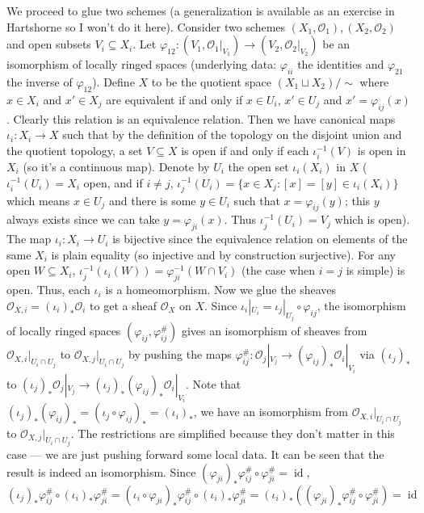 \documentclass[12pt]{article}
\theoremstyle{remark}
\newcommand{\id}[0]{\operatorname{id}}
\begin{document}
	We proceed to glue two schemes (a generalization is available as an exercise in Hartshorne so I won't do it here). Consider two schemes $(X_1,\mathscr O_1), (X_2, \mathscr O_2)$ and open subsets $V_i\subseteq X_i$. Let $\varphi_{12}: (V_1,\mathscr O_1|_{V_1})\to (V_2,\mathscr O_2|_{V_2})$ be an isomorphism of locally ringed spaces (underlying data: $\varphi_{ii}$ the identities and $\varphi_{21}$ the inverse of $\varphi_{12}$). Define $X$ to be the quotient space $(X_1\sqcup X_2)/\sim$ where $x\in X_i$ and $x'\in X_j$ are equivalent if and only if $x\in U_i$, $x'\in U_j$ and $x'=\varphi_{ij}(x)$. Clearly this relation is an equivalence relation. Then we have canonical maps $\iota_i:X_i\to X$ such that by the definition of the topology on the disjoint union and the quotient topology, a set $V\subseteq X$ is open if and only if each $\iota_i^{-1}(V)$ is open in $X_i$ (so it's a continuous map). Denote by $U_i$ the open set $\iota_i(X_i)$ in $X$ ($\iota_i^{-1}(U_i)=X_i$ open, and if $i\neq j$, $\iota_j^{-1}(U_i)=\{x\in X_j:[x]=[y]\in\iota_i(X_i)\}$ which means $x\in U_j$ and there is some $y\in U_i$ such that $x=\varphi_{ij}(y)$; this $y$ always exists since we can take $y=\varphi_{ji}(x)$. Thus $\iota_j^{-1}(U_i)=V_j$ which is open). The map $\iota_i:X_i\to U_i$ is bijective since the equivalence relation on elements of the same $X_i$ is plain equality (so injective and by construction surjective). For any open $W\subseteq X_i$, $\iota_j^{-1}(\iota_i(W))=\varphi_{ji}^{-1}(W\cap V_i)$ (the case when $i=j$ is simple) is open. Thus, each $\iota_i$ is a homeomorphism. Now we glue the sheaves $\mathscr O_{X, i}=\left(\iota_{i}\right)_*\mathscr O_i$ to get a sheaf $\mathscr O_X$ on $X$. Since $\iota_i|_{U_i}=\iota_{j}|_{U_j}\circ \varphi_{ij}$, the isomorphism of locally ringed spaces $(\varphi_{ij},\varphi_{ij}^\#)$ gives an isomorphism of sheaves from $\mathscr O_{X, i}|_{U_i\cap U_j}$ to $\mathscr O_{X, j}|_{U_i\cap U_j}$ by pushing the maps $\varphi_{ij}^\#:\mathscr O_j|_{V_j}\to(\varphi_{ij})_*\mathscr O_i|_{V_i}$ via $(\iota_j)_*$ to $(\iota_j)_*\mathscr O_j|_{V_j}\to(\iota_j)_*(\varphi_{ij})_*\mathscr O_i|_{V_i}$. Note that $(\iota_j)_*(\varphi_{ij})_*=(\iota_j\circ\varphi_{ij})_*=(\iota_i)_*$, we have an isomorphism from $\mathscr O_{X, i}|_{U_i\cap U_j}$ to $\mathscr O_{X, j}|_{U_i\cap U_j}$. The restrictions are simplified because they don't matter in this case --- we are just pushing forward some local data. It can be seen that the result is indeed an isomorphism. Since $(\varphi_{ji})_*\varphi_{ij}^\#\circ\varphi_{ji}^\#=\id$, 
	\[(\iota_j)_*\varphi_{ij}^\#\circ (\iota_i)_*\varphi_{ji}^\#=(\iota_i\circ\varphi_{ji})_*\varphi_{ij}^\#\circ (\iota_i)_*\varphi_{ji}^\#=(\iota_i)_*\left((\varphi_{ji})_*\varphi_{ij}^\#\circ\varphi_{ji}^\#\right)=\id\]
\end{document}
